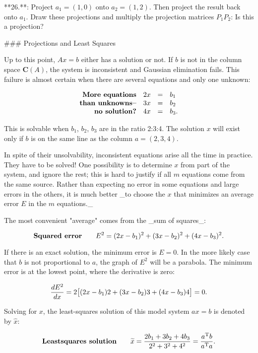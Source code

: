

**26.**: Project \(a_{1}=(1,0)\) onto \(a_{2}=(1,2)\). Then project the result back onto \(a_{1}\). Draw these projections and multiply the projection matrices \(P_{1}P_{2}\): Is this a projection?

### Projections and Least Squares

Up to this point, \(Ax=b\) either has a solution or not. If \(b\) is not in the column space \(\boldsymbol{C}(A)\), the system is inconsistent and Gaussian elimination fails. This failure is almost certain when there are several equations and only one unknown:

\[\begin{array}{rllll}\mbox{\bf More equations}&2x&=&b_{1}\\ \mbox{\bf than unknowns--}&3x&=&b_{2}\\ \mbox{\bf no solution?}&4x&=&b_{3}.\end{array}\]

This is solvable when \(b_{1}\), \(b_{2}\), \(b_{3}\) are in the ratio 2:3:4. The solution \(x\) will exist only if \(b\) is on the same line as the column \(a=(2,3,4)\).

In spite of their unsolvability, inconsistent equations arise all the time in practice. They have to be solved! One possibility is to determine \(x\) from part of the system, and ignore the rest; this is hard to justify if all \(m\) equations come from the same source. Rather than expecting no error in some equations and large errors in the others, it is much better _to choose the \(x\) that minimizes an average error \(E\) in the \(m\) equations._

The most convenient "average" comes from the _sum of squares_:

\[\mbox{\bf Squared error}\qquad E^{2}=(2x-b_{1})^{2}+(3x-b_{2})^{2}+(4x-b_{3})^{2}.\]

If there is an exact solution, the minimum error is \(E=0\). In the more likely case that \(b\) is not proportional to \(a\), the graph of \(E^{2}\) will be a parabola. The minimum error is at the lowest point, where the derivative is zero:

\[\frac{dE^{2}}{dx}=2\big{[}(2x-b_{1})2+(3x-b_{2})3+(4x-b_{3})4\big{]}=0.\]

Solving for \(x\), the least-squares solution of this model system \(ax=b\) is denoted by \(\widehat{x}\):

\[\mbox{\bf Leastsquares solution}\qquad\widetilde{x}=\frac{2b_{1}+3b_{2}+4b_{3}}{2 ^{2}+3^{2}+4^{2}}=\frac{a^{\mathrm{T}}b}{a^{\mathrm{T}}a}.\]

